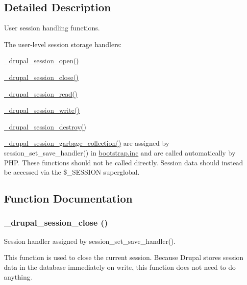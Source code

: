 \subsection{Detailed Description}
User session handling functions.

The user-\/level session storage handlers:
\begin{DoxyItemize}
\item \hyperlink{session_8inc_ac8852f85f169dfbee885d44239a6048c}{\_\-drupal\_\-session\_\-open()}
\item \hyperlink{session_8inc_a442fb2eb576d761183c100cdd1c078fd}{\_\-drupal\_\-session\_\-close()}
\item \hyperlink{session_8inc_aeb991b6399401804bd0072e5ee6e4741}{\_\-drupal\_\-session\_\-read()}
\item \hyperlink{session_8inc_a4c7b4bd789e8a27c6c7078cb1a32f8f9}{\_\-drupal\_\-session\_\-write()}
\item \hyperlink{session_8inc_af8a3df8c027292c59745d5ce00025480}{\_\-drupal\_\-session\_\-destroy()}
\item \hyperlink{session_8inc_a27392dffc0efaa15d678b516379eec99}{\_\-drupal\_\-session\_\-garbage\_\-collection()} are assigned by session\_\-set\_\-save\_\-handler() in \hyperlink{bootstrap_8inc}{bootstrap.inc} and are called automatically by PHP. These functions should not be called directly. Session data should instead be accessed via the \$\_\-SESSION superglobal. 
\end{DoxyItemize}

\subsection{Function Documentation}
\hypertarget{session_8inc_a442fb2eb576d761183c100cdd1c078fd}{
\subsubsection[{\_\-drupal\_\-session\_\-close}]{\setlength{\rightskip}{0pt plus 5cm}\_\-drupal\_\-session\_\-close ()}}
\label{session_8inc_a442fb2eb576d761183c100cdd1c078fd}
Session handler assigned by session\_\-set\_\-save\_\-handler().

This function is used to close the current session. Because Drupal stores session data in the database immediately on write, this function does not need to do anything.

